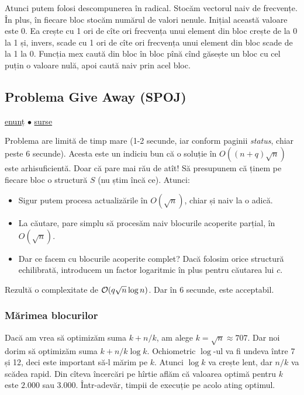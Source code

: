 \documentclass[../main.tex]{subfiles}
\begin{document}
Atunci putem folosi descompunerea în radical. Stocăm vectorul naiv de frecvențe. În plus, în fiecare bloc stocăm numărul de valori nenule. Inițial această valoare este 0. Ea crește cu 1 ori de cîte ori frecvența unui element din bloc crește de la 0 la 1 și, invers, scade cu 1 ori de cîte ori frecvența unui element din bloc scade de la 1 la 0. Funcția mex caută din bloc în bloc pînă cînd găsește un bloc cu cel puțin o valoare nulă, apoi caută naiv prin acel bloc.

\subsection{Problema Give Away (SPOJ)}
\label{problem:give-away}

\href{https://www.spoj.com/problems/GIVEAWAY/}{enunț}
$\bullet$
\hyperref[code:give-away]{surse}

Problema are limită de timp mare (1-2 secunde, iar conform paginii \textit{status}, chiar peste 6 secunde). Acesta este un indiciu bun că o soluție în $O((n + q) \sqrt{n})$ este arhisuficientă. Doar că pare mai rău de atît! Să presupunem că ținem pe fiecare bloc o structură $S$ (nu știm încă ce). Atunci:

\begin{itemize}
  \item Sigur putem procesa actualizările în $O(\sqrt{n})$, chiar și naiv la o adică.
  \item La căutare, pare simplu să procesăm naiv blocurile acoperite parțial, în $O(\sqrt{n})$.
  \item Dar ce facem cu blocurile acoperite complet? Dacă folosim orice structură echilibrată, introducem un factor logaritmic în plus pentru căutarea lui $c$.
\end{itemize}

Rezultă o complexitate de $\mathcal{O}(q \sqrt{n} \log n)$. Dar în 6 secunde, este acceptabil.

\subsubsection*{Mărimea blocurilor}

Dacă am vrea să optimizăm suma $k + n/k$, am alege $k=\sqrt{n} \approx 707$. Dar noi dorim să optimizăm suma $k + n/k \log k$. Ochiometric $\log$-ul va fi undeva între 7 și 12, deci este important să-l mărim pe $k$. Atunci $\log k$ va crește lent, dar $n/k$ va scădea rapid. Din cîteva încercări pe hîrtie aflăm că valoarea optimă pentru $k$ este $2.000$ sau $3.000$. Într-adevăr, timpii de execuție pe acolo ating optimul.
\end{document}
